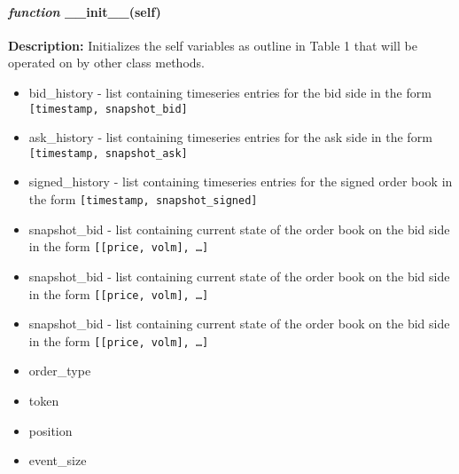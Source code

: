 \paragraph{\textit{function} \_\_init\_\_(self)}\hfill\break
\textbf{Description:} Initializes the self variables as outline in Table 1 that will be operated on by other class methods. 

\begin{itemize}
	\item  bid\_history - list containing timeseries entries for the bid side in the form \texttt{[timestamp, snapshot\_bid]}
	\item  ask\_history - list containing timeseries entries for the ask side in the form \texttt{[timestamp, snapshot\_ask]}
	\item  signed\_history - list containing timeseries entries for the signed order book in the form \texttt{[timestamp, snapshot\_signed]}
	\item snapshot\_bid - list containing current state of the order book on the bid side in the form \texttt{[[price, volm], \ldots ]}
	\item snapshot\_bid - list containing current state of the order book on the bid side in the form \texttt{[[price, volm], \ldots ]}
	\item snapshot\_bid - list containing current state of the order book on the bid side in the form \texttt{[[price, volm], \ldots ]}
	\item order\_type 
	\item token
	\item position
	\item event\_size 
\end{itemize}